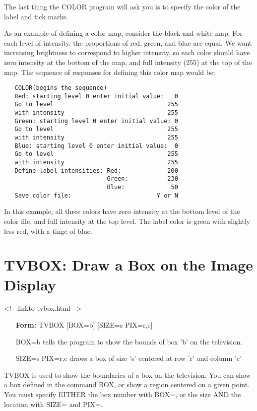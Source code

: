 The last thing the COLOR program will ask you is to specify the color of
the label and tick marks.

As an example of defining a color map, consider the black and white map.
For each level of intensity, the proportions of red, green, and blue are
equal.  We want increasing brightness to correspond to higher intensity, so
each color should have zero intensity at the bottom of the map, and full
intensity (255) at the top of the map.  The sequence of responses for
defining this color map would be:
\begin{verbatim}
   COLOR(begins the sequence)
   Red: starting level 0 enter initial value:   0
   Go to level                                255
   with intensity                             255
   Green: starting level 0 enter initial value: 0
   Go to level                                255
   with intensity                             255
   Blue: starting level 0 enter initial value:  0
   Go to level                                255
   with intensity                             255
   Define label intensities: Red:             200
                             Green:           230
                             Blue:             50
   Save color file:                        Y or N
\end{verbatim}

In this example, all three colors have zero intensity at the bottom level
of the color file, and full intensity at the top level.  The label color is
green with slightly less red, with a tinge of blue.

\section{TVBOX: Draw a Box on the Image Display}
\begin{rawhtml}
<!-- linkto tvbox.html -->
\end{rawhtml}
\begin{itemize}
  \item[\textbf{Form: } TVBOX {[BOX=b]} {[SIZE=s PIX=r,c]}\hfill]{}
  \item[BOX=b]{tells the program to show the bounds
       of box 'b' on the television.}
  \item[SIZE=s PIX=r,c]{draws a box of size 's' centered at row 
       'r' and column 'c'}
\end{itemize}

TVBOX is used to show the boundaries of a box on the television.  You can
show a box defined in the command BOX, or show a region centered on a given
point.  You must specify EITHER the box number with BOX=, or the size AND
the location with SIZE= and PIX=.

